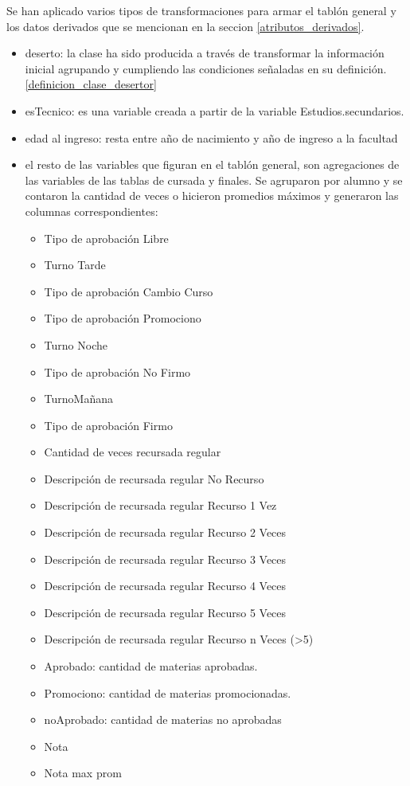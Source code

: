 Se han aplicado varios tipos de transformaciones para armar el tablón general y los datos derivados que se mencionan en la seccion \ref{atributos_derivados}.\\

\begin{itemize}
	\item deserto: la clase ha sido producida a través de transformar la información inicial agrupando y cumpliendo las condiciones señaladas en su definición. \ref{definicion_clase_desertor}
	\item esTecnico: es una variable creada a partir de la variable Estudios.secundarios.
	\item edad al ingreso: resta entre año de nacimiento y año de ingreso a la facultad
	\item el resto de las variables que figuran en el tablón general, son agregaciones de las variables de las tablas de cursada y finales. Se agruparon por alumno y se contaron la cantidad de veces o hicieron promedios máximos y generaron las columnas correspondientes:
	\begin{itemize}
		\item Tipo de aprobación Libre	
		\item Turno Tarde
		\item Tipo de aprobación Cambio Curso
		\item Tipo de aprobación Promociono
		\item Turno Noche
		\item Tipo de aprobación No Firmo
		\item TurnoMañana
		\item Tipo de aprobación Firmo
		\item Cantidad de veces recursada regular
		\item Descripción de recursada regular No Recurso
		\item Descripción de recursada regular Recurso 1 Vez
		\item Descripción de recursada regular Recurso 2 Veces
		\item Descripción de recursada regular Recurso 3 Veces
		\item Descripción de recursada regular Recurso 4 Veces
		\item Descripción de recursada regular Recurso 5 Veces
		\item Descripción de recursada regular Recurso n Veces (>5)
		\item Aprobado: cantidad de materias aprobadas.
		\item Promociono: cantidad de materias promocionadas.
		\item noAprobado: cantidad de materias no aprobadas
		\item Nota
		\item Nota max prom
	\end{itemize} 
\end{itemize}


